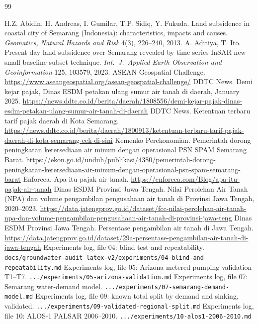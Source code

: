 \begin{thebibliography}{99}\small\raggedright
{} H.Z. Abidin, H. Andreas, I. Gumilar, T.P. Sidiq, Y. Fukuda. Land subsidence in coastal city of Semarang (Indonesia): characteristics, impacts and causes. \emph{Geomatics, Natural Hazards and Risk} 4(3), 226--240, 2013.
 A. Aditiya, T. Ito. Present-day land subsidence over Semarang revealed by time series InSAR new small baseline subset technique. \emph{Int.\ J.\ Applied Earth Observation and Geoinformation} 125, 103579, 2023.
 ASEAN Geospatial Challenge. \url{https://www.aseangeospatial.org/asean-geospatial-challenge/}
 DDTC News. Demi kejar pajak, Dinas ESDM petakan ulang sumur air tanah di daerah, January 2025. \url{https://news.ddtc.co.id/berita/daerah/1808556/demi-kejar-pajak-dinas-esdm-petakan-ulang-sumur-air-tanah-di-daerah}
 DDTC News. Ketentuan terbaru tarif pajak daerah di Kota Semarang. \url{https://news.ddtc.co.id/berita/daerah/1800913/ketentuan-terbaru-tarif-pajak-daerah-di-kota-semarang-cek-di-sini}
 Kemenko Perekonomian. Pemerintah dorong peningkatan ketersediaan air minum dengan operasional PSN SPAM Semarang Barat. \url{https://ekon.go.id/unduh/publikasi/4380/pemerintah-dorong-peningkatan-ketersediaan-air-minum-dengan-operasional-psn-spam-semarang-barat}
 Enforcea. Apa itu pajak air tanah. \url{https://enforcea.com/Blog/apa-itu-pajak-air-tanah}
 Dinas ESDM Provinsi Jawa Tengah. Nilai Perolehan Air Tanah (NPA) dan volume pengambilan pengusahaan air tanah di Provinsi Jawa Tengah, 2020--2023. \url{https://data.jatengprov.go.id/dataset/fcc-nilai-perolehan-air-tanah-npa-dan-volume-pengambilan-pengusahaan-air-tanah-di-provinsi-jawa-teng}
 Dinas ESDM Provinsi Jawa Tengah. Persentase pengambilan air tanah di Jawa Tengah. \url{https://data.jatengprov.go.id/dataset/29a-persentase-pengambilan-air-tanah-di-jawa-tengah}
 Experiments log, file 04: blind test and repeatability. \texttt{docs/groundwater-audit-latex-v2/experiments/04-blind-and-repeatability.md}
 Experiments log, file 05: Arizona metered-pumping validation T1--T7. \texttt{.../experiments/05-arizona-validation.md}
 Experiments log, file 07: Semarang water-demand model. \texttt{.../experiments/07-semarang-demand-model.md}
 Experiments log, file 09: known total split by demand and sinking, validated. \texttt{.../experiments/09-validated-regional-split.md}
 Experiments log, file 10: ALOS-1 PALSAR 2006--2010. \texttt{.../experiments/10-alos1-2006-2010.md}

\end{thebibliography}

